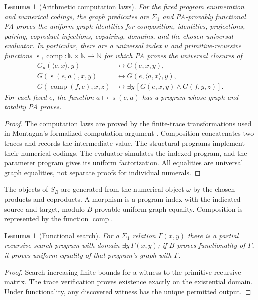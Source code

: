 \documentclass[11pt]{article}
\newtheorem{lemma}[theorem]{Lemma}
\theoremstyle{definition}\newtheorem{definition}[theorem]{Definition}
\newcommand{\N}{\mathbb N}
\begin{document}
\begin{lemma}[Arithmetic computation laws]\label{lem:computation}
For the fixed program enumeration and numerical codings, the graph
predicates are $\Sigma_1$ and
PA-provably functional. PA proves the uniform graph identities for
composition, identities, projections, pairing, coproduct injections,
copairing, domains, and the chosen universal evaluator. In particular,
there are a universal index $u$ and primitive-recursive functions
$\operatorname{s},\operatorname{comp}:\N\times\N\to\N$ for which
PA proves the universal closures of
\[
\begin{aligned}
G_u(\langle e,x\rangle,y)&\leftrightarrow G(e,x,y),\\
G(\operatorname{s}(e,a),x,y)&\leftrightarrow G(e,\langle a,x\rangle,y),\\
G(\operatorname{comp}(f,e),x,z)&\leftrightarrow
 \exists y\,[G(e,x,y)\land G(f,y,z)].
\end{aligned}
\]
For each fixed $e$, the function $a\mapsto\operatorname{s}(e,a)$
has a program whose graph and totality PA proves.
\end{lemma}
\begin{proof}
The computation laws are proved by the finite-trace transformations
used in Montagna's formalized computation argument \cite{Montagna}.
Composition concatenates two traces and records the intermediate
value. The structural programs implement their numerical codings.
The evaluator simulates the indexed program, and the parameter
program gives its uniform factorization. All equalities are universal
graph equalities, not separate proofs for individual numerals.
\end{proof}
The objects of $S_B$ are generated from the numerical object
$\omega$ by the chosen products and coproducts. A morphism is a
program index with the indicated source and target, modulo
$B$-provable uniform graph equality. Composition is represented
by the function $\operatorname{comp}$.

\begin{lemma}[Functional search]\label{lem:search}
For a $\Sigma_1$ relation $\Gamma(x,y)$ there is a partial recursive
search program with domain $\exists y\,\Gamma(x,y)$; if $B$ proves
functionality of $\Gamma$, it proves uniform equality of that
program's graph with $\Gamma$.
\end{lemma}
\begin{proof}
Search increasing finite bounds for a witness to the primitive
recursive matrix. The trace verification proves existence exactly
on the existential domain. Under functionality, any discovered
witness has the unique permitted output.
\end{proof}
\end{document}

